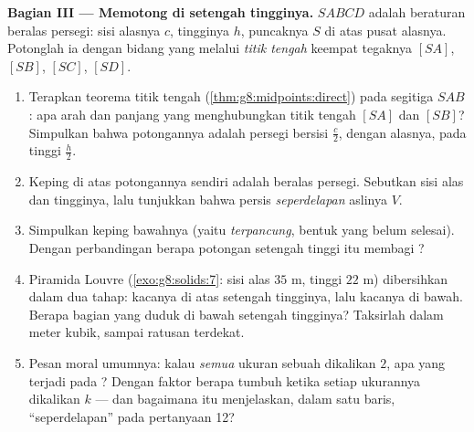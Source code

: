 \begin{problem}
\medskip
\noindent\textbf{Bagian III --- Memotong  di setengah tingginya.}
$SABCD$ adalah  beraturan beralas persegi: sisi alasnya $c$,
tingginya $h$, puncaknya $S$ di atas pusat alasnya. Potonglah ia
dengan bidang yang melalui \emph{titik tengah} keempat  tegaknya
$[SA]$, $[SB]$, $[SC]$, $[SD]$.
\begin{enumerate}[resume]
  \item Terapkan teorema titik tengah
        (\cref{thm:g8:midpoints:direct}) pada segitiga $SAB$:
        apa arah dan panjang  yang menghubungkan
        titik tengah $[SA]$ dan $[SB]$? Simpulkan bahwa
        potongannya adalah persegi bersisi $\frac{c}{2}$, 
        dengan alasnya, pada tinggi $\frac{h}{2}$.
  \item Keping di atas potongannya sendiri adalah  beralas
        persegi. Sebutkan sisi alas dan tingginya, lalu tunjukkan
        bahwa  persis \emph{seperdelapan}  aslinya $V$.
  \item Simpulkan  keping bawahnya (yaitu \emph{
        terpancung}, bentuk  yang belum selesai). Dengan
        perbandingan berapa potongan setengah tinggi itu membagi
        ?
  \item Piramida Louvre (\cref{exo:g8:solids:7}: sisi alas
        $35$ m, tinggi $22$ m) dibersihkan dalam dua tahap: kacanya
        di atas setengah tingginya, lalu kacanya di bawah. Berapa
        bagian \emph{} yang duduk di bawah setengah
        tingginya? Taksirlah dalam meter kubik, sampai ratusan
        terdekat.
  \item Pesan moral umumnya: kalau \emph{semua} ukuran sebuah
         dikalikan $2$, apa yang terjadi pada
        ? Dengan faktor berapa  tumbuh ketika
        setiap ukurannya dikalikan $k$ --- dan bagaimana itu
        menjelaskan, dalam satu baris, ``seperdelapan'' pada
        pertanyaan 12?

\end{enumerate}
\end{problem}
